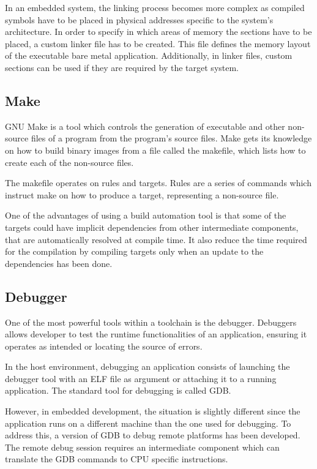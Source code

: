 In an embedded system, the linking process becomes more complex as compiled 
symbols have to be placed in physical addresses specific to the system's
architecture.
In order to specify in which areas of memory the sections have to be placed,
a custom linker file has to be created. This file defines the memory layout of
the executable bare metal application.
Additionally, in linker files, custom sections can be used if they are required
by the target system.

\subsection{Make}

GNU Make is a tool which controls the generation of executable and other
non-source files of a program from the program's source files. \cite{GNUMake}
Make gets its knowledge on how to build binary images from a file called
the makefile, which lists how to create each of the non-source files.

The makefile operates on rules and targets. Rules are a series of commands which
instruct make on how to produce a target, representing a non-source file.

One of the advantages of using a build automation tool is that some of the
targets could have implicit dependencies from other intermediate components,
that are automatically resolved at compile time.
It also reduce the time required for the compilation by compiling targets only
when an update to the dependencies has been done.

\subsection{Debugger}

One of the most powerful tools within a toolchain is the debugger. Debuggers
allows developer to test the runtime functionalities of an application,
ensuring it operates as intended or locating the source of errors.

In the host environment, debugging an application consists of launching the
debugger tool with an ELF file as argument or attaching it to a running
application. The standard tool for debugging is called GDB.

However, in embedded development, the situation is slightly different since the
application runs on a different machine than the one used for debugging.
To address this, a version of GDB to debug remote platforms has been developed.
The remote debug session requires an intermediate component which can translate
the GDB commands to CPU specific instructions.

